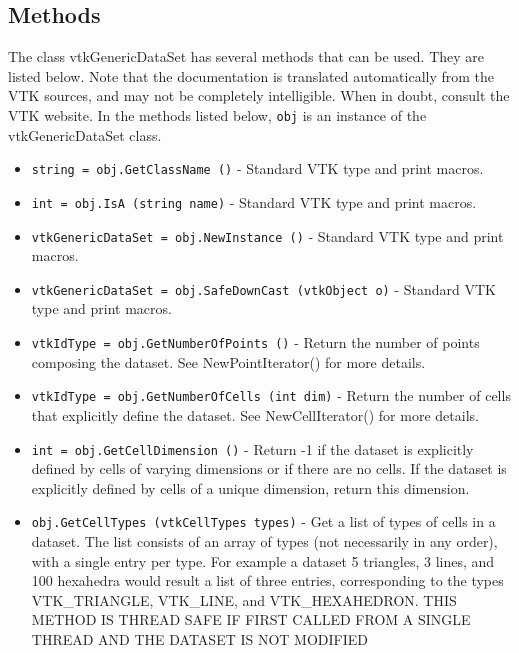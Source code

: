 \subsection{Methods}

The class vtkGenericDataSet has several methods that can be used.
  They are listed below.
Note that the documentation is translated automatically from the VTK sources,
and may not be completely intelligible.  When in doubt, consult the VTK website.
In the methods listed below, \verb|obj| is an instance of the vtkGenericDataSet class.
\begin{itemize}
\item  \verb|string = obj.GetClassName ()| -  Standard VTK type and print macros.

\item  \verb|int = obj.IsA (string name)| -  Standard VTK type and print macros.

\item  \verb|vtkGenericDataSet = obj.NewInstance ()| -  Standard VTK type and print macros.

\item  \verb|vtkGenericDataSet = obj.SafeDownCast (vtkObject o)| -  Standard VTK type and print macros.

\item  \verb|vtkIdType = obj.GetNumberOfPoints ()| -  Return the number of points composing the dataset. See NewPointIterator()
 for more details.
 

\item  \verb|vtkIdType = obj.GetNumberOfCells (int dim)| -  Return the number of cells that explicitly define the dataset. See
 NewCellIterator() for more details.
 
 

\item  \verb|int = obj.GetCellDimension ()| -  Return -1 if the dataset is explicitly defined by cells of varying
 dimensions or if there are no cells. If the dataset is explicitly
 defined by cells of a unique dimension, return this dimension.
 

\item  \verb|obj.GetCellTypes (vtkCellTypes types)| -  Get a list of types of cells in a dataset. The list consists of an array
 of types (not necessarily in any order), with a single entry per type.
 For example a dataset 5 triangles, 3 lines, and 100 hexahedra would
 result a list of three entries, corresponding to the types VTK\_TRIANGLE,
 VTK\_LINE, and VTK\_HEXAHEDRON.
 THIS METHOD IS THREAD SAFE IF FIRST CALLED FROM A SINGLE THREAD AND
 THE DATASET IS NOT MODIFIED
 


\end{itemize}

